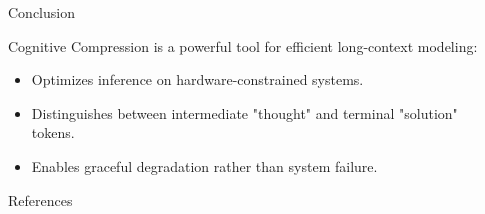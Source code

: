 \documentclass[final]{beamer}
\newlength{\sepwidth}
\newlength{\colwidth}
\newcommand{\separatorcolumn}{\begin{column}{\sepwidth}\end{column}}
\begin{document}
\begin{frame}[t]
\begin{columns}[t]
\begin{column}{\colwidth}
  \begin{block}{Conclusion}

    Cognitive Compression is a powerful tool for efficient long-context modeling:
    \begin{itemize}
        \item Optimizes inference on hardware-constrained systems.
        \item Distinguishes between intermediate "thought" and terminal "solution" tokens.
        \item Enables graceful degradation rather than system failure.

    \end{itemize}

  \end{block}

  \begin{block}{References}

    \nocite{*}
    \footnotesize{}

  \end{block}

\end{column}

\separatorcolumn
\end{columns}
\end{frame}
\end{document}
